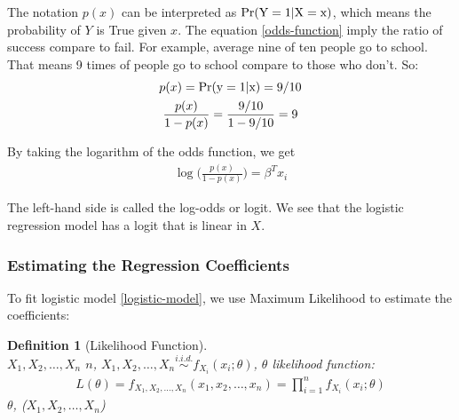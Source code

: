     \documentclass[12pt,fleqn,a4paper]{article}%
\newtheorem{definition}{Definition}
\theoremstyle{definition}
\theoremstyle{plain}
\numberwithin{equation}{section}
\begin{document}
The notation $p(x)$ can be interpreted as ${\rm Pr(Y=1|X=x)}$, which means the probability of $Y$ is True given $x$.
The equation \eqref{odds-function} imply the ratio of success compare to fail. For example, average nine of ten people go to school.
That means 9 times of people go to school compare to those who don't. So:
\begin{gather*}
p(x) = {\rm Pr(y=1|x)} = 9/10 \\
\frac{p(x)}{1-p(x)} = \frac{9/10}{1-9/10} = 9
\end{gather*}

By taking the logarithm of the odds function, we get
\begin{gather}
\log \bigg( \frac{p(x)}{1-p(x)} \bigg)= \beta^{T}x_{i}
\end{gather}

The left-hand side is called the log-odds or logit. We see that the logistic regression model has a logit that is linear in $X$.


\subsubsection{\textbf{Estimating the Regression Coefficients}}
To fit logistic model \eqref{logistic-model}, we use Maximum Likelihood to estimate the coefficients:
\begin{framed}
\begin{definition}[Likelihood Function]
~\\
$X_{1},X_{2},\dots,X_{n}$ {\MbQ{}}$n${\MaQ{}}, {\McQ{}}$X_{1},X_{2},\dots,X_{n} \stackrel{i.i.d.}{\sim} f_{X_{i}}(x_{i};\theta)$, {\MaQ{}} $\theta$ {\MaQ{}} likelihood function:
\begin{gather*}
L(\theta) = f_{X_{1},X_{2},\dots,X_{n}}(x_{1},x_{2},\dots,x_{n}) = \prod_{i=1}^{n}f_{X_{i}}(x_{i};\theta)
\end{gather*}
{\MaQ{}}$\theta${\MaQ{}}, {\MfQ{}} ($X_{1},X_{2},\dots,X_{n}$) {\MaQ{}}
\end{definition}
\end{framed}
\end{document}
